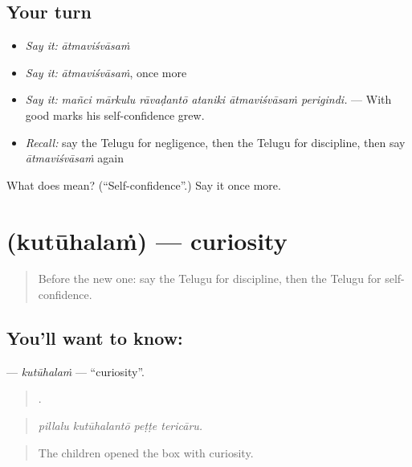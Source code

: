 \subsection*{Your turn}
\begin{itemize}
\raggedright
  \item \emph{Say it:} \emph{ātmaviśvāsaṁ}
  \item \emph{Say it:} \emph{ātmaviśvāsaṁ}, once more
  \item \emph{Say it:} \emph{mañci mārkulu rāvaḍantō ataniki ātmaviśvāsaṁ perigindi.} — With good marks his self-confidence grew.
  \item \emph{Recall:} say the Telugu for negligence, then the Telugu for discipline, then say \emph{ātmaviśvāsaṁ} again
\end{itemize}

\begin{tcolorbox}[breakable,colback=teal!4,colframe=teal!35!black,title={Before you move on}]
What does  mean? (\textquotedblleft{}Self-confidence\textquotedblright{}.) Say it once more.
\end{tcolorbox}
\section[\texorpdfstring{\te{కుతూహలం} (kutūhalaṁ)}{కుతూహలం (kutūhalaṁ)}]{ (kutūhalaṁ) — curiosity}

\label{lesson:TE-C510-kutuhalam}



\begin{quote}
Before the new one: say the Telugu for discipline, then the Telugu for self-confidence.
\end{quote}

\subsection*{You'll want to know: }
\textbf{} — \emph{kutūhalaṁ} — \textquotedblleft{}curiosity\textquotedblright{}.

\begin{quote}
   .
\end{quote}

\begin{quote}
\emph{pillalu kutūhalantō peṭṭe tericāru.}
\end{quote}

\begin{quote}
The children opened the box with curiosity.
\end{quote}


